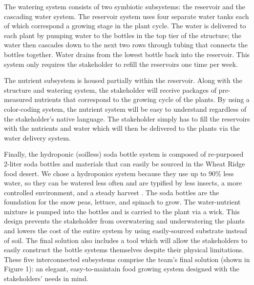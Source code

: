 \documentclass[12pt]{article}
\begin{document}
{    The watering system consists of two symbiotic subsystems: the reservoir and the cascading water
    system. The reservoir system uses four separate water tanks each of which correspond a growing
    stage in the plant cycle. The water is delivered to each plant by pumping water to the bottles
    in the top tier of the structure; the water then cascades down to the next two rows through
    tubing that connects the bottles together. Water drains from the lowest bottle back into the
    reservoir. This system only requires the stakeholder to refill the reservoirs one time per week.

    The nutrient subsystem is housed partially within the reservoir. Along with the structure and
    watering system, the stakeholder will receive packages of pre-measured nutrients that correspond
    to the growing cycle of the plants. By using a color-coding system, the nutrient system will be
    easy to understand regardless of the stakeholder’s native language. The stakeholder simply has
    to fill the reservoirs with the nutrients and water which will then be delivered to the plants
    via the water delivery system.

    Finally, the hydroponic (soilless) soda bottle system is composed of re-purposed 2-liter soda
    bottles and materials that can easily be sourced in the Wheat Ridge food desert. We chose a
    hydroponics system because they use up to 90\% less water, so they can be watered less often and
    are typified by less insects, a more controlled environment, and a steady harvest
    \cite{j-camas}. The soda bottles are the foundation for the snow peas, lettuce, and spinach to
    grow. The water-nutrient mixture is pumped into the bottles and is carried to the plant via a
    wick. This design prevents the stakeholder from overwatering and underwatering the plants and
    lowers the cost of the entire system by using easily-sourced substrate instead of soil.  The
    final solution also includes a tool which will allow the stakeholders to easily construct the
    bottle systems themselves despite their physical limitations. These five interconnected
    subsystems comprise the team's final solution (shown in Figure 1): an elegant, easy-to-maintain 
    food growing system designed with the stakeholders’ needs in mind.

}
\end{document}
